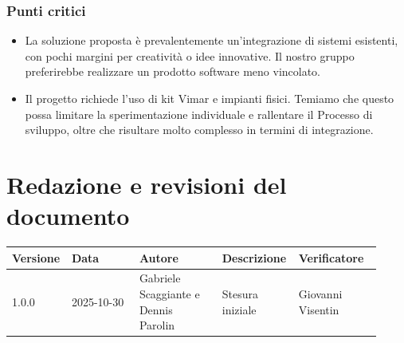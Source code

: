 \documentclass[a4paper,12pt]{article}
\begin{document}
\subsubsection{Punti critici}
\begin{itemize}
    \item La soluzione proposta è prevalentemente un’integrazione di sistemi esistenti, con pochi margini per creatività o idee innovative. Il nostro gruppo preferirebbe realizzare un prodotto software meno vincolato.
    \item Il progetto richiede l’uso di kit Vimar e impianti fisici. Temiamo che questo possa limitare la sperimentazione individuale e rallentare il Processo di sviluppo, oltre che risultare molto complesso in termini di integrazione.
\end{itemize}



\clearpage
\section{Redazione e revisioni del documento}

\begin{center}
\small
\renewcommand{\arraystretch}{1.2} 
\begin{tabular}{|p{0.1\linewidth}|p{0.18\linewidth}|p{0.22\linewidth}|p{0.20\linewidth}|p{0.22\linewidth}|}
\hline
\rowcolor{gray!60} 
\textbf{Versione} & \textbf{Data} & \textbf{Autore} & \textbf{Descrizione} & \textbf{Verificatore} \\
\hline
\rowcolor{white}
1.0.0 & 2025-10-30 & Gabriele Scaggiante e Dennis Parolin & Stesura iniziale & Giovanni Visentin \\
\hline

\end{tabular}
\end{center}
\end{document}
